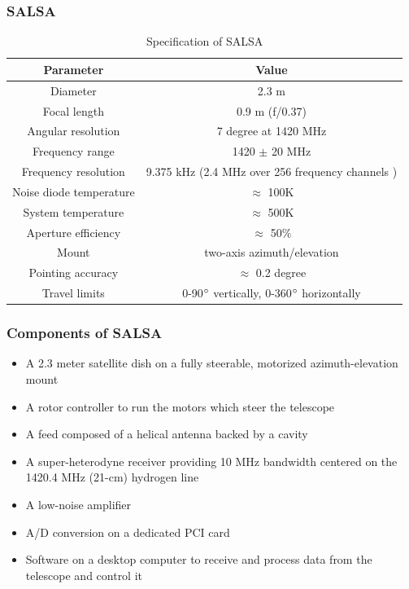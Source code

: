 \documentclass{beamer}
\begin{document}

\begin{frame}
\frametitle{SALSA}
\begin{table}
\caption{Specification of SALSA}
\begin{tabular}{|c|c|}
\hline
\textbf{Parameter}&\multicolumn{1}{|c|}{\textbf{Value}} \\
\cline{1-2} 
\hline
Diameter & 2.3 m\\
\hline
Focal length & 0.9 m (f/0.37)\\
\hline
Angular resolution & 7 degree at 1420 MHz\\
\hline
Frequency range & 1420 $\pm$ 20 MHz\\
\hline
Frequency resolution & 9.375 kHz (2.4 MHz over 256 frequency channels )\\
\hline
Noise diode temperature & $\approx$ 100K\\
\hline
System temperature & $\approx$ 500K\\
\hline
Aperture efficiency & $\approx$ 50$\%$\\
\hline
Mount & two-axis azimuth/elevation\\
\hline
Pointing accuracy & $\approx$ 0.2 degree\\
\hline
Travel limits &  0-90$\degree$ vertically, 0-360$\degree$ horizontally\\
\hline
\end{tabular}
\label{Tab:salsa_specification}
\end{table}
\end{frame}
\begin{frame}
\frametitle{Components of SALSA}
\begin{itemize}
\item A 2.3 meter satellite dish on a fully steerable, motorized azimuth-elevation mount
\item A rotor controller to run the motors which steer the telescope
\item A feed composed of a helical antenna backed by a cavity
\item A super-heterodyne receiver providing 10 MHz bandwidth centered on the 1420.4 MHz (21-cm) hydrogen line
\item A low-noise amplifier
\item A/D conversion on a dedicated PCI card
\item Software on a desktop computer to receive and process data from the telescope and control it
\end{itemize}
\end{frame}
\end{document}
